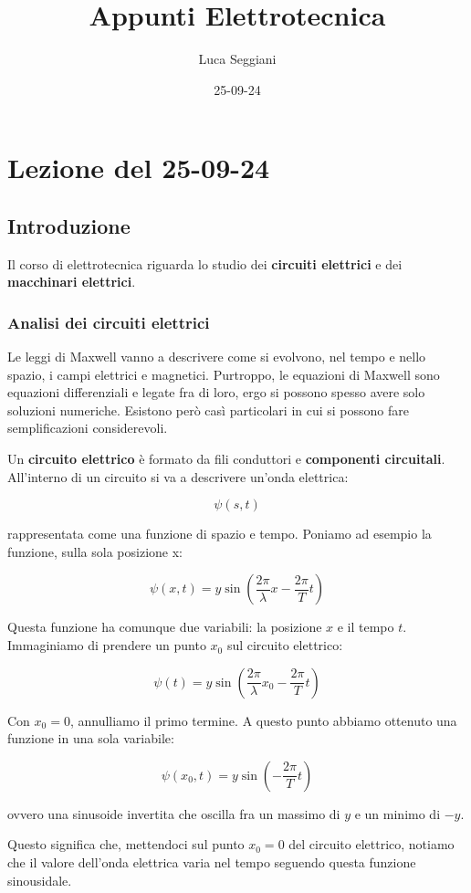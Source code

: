 \documentclass[a4paper,11pt]{article}
\title{Appunti Elettrotecnica}
\author{Luca Seggiani}
\date{25-09-24}
\begin{document}
\section{Lezione del 25-09-24}

\thispagestyle{empty}
\pagestyle{fancy}

\subsection{Introduzione}
Il corso di elettrotecnica riguarda lo studio dei \textbf{circuiti elettrici} e dei \textbf{macchinari elettrici}.

\subsubsection{Analisi dei circuiti elettrici}

Le leggi di Maxwell vanno a descrivere come si evolvono, nel tempo e nello spazio, i campi elettrici e magnetici.
Purtroppo,  le equazioni di Maxwell sono equazioni differenziali e legate fra di loro, ergo si possono spesso avere solo soluzioni numeriche.
Esistono però casì particolari in cui si possono fare semplificazioni considerevoli.

Un \textbf{circuito elettrico} è formato da fili conduttori e \textbf{componenti circuitali}.
All'interno di un circuito si va a descrivere un'onda elettrica:

$$
	\psi(s,t)
$$

rappresentata come una funzione di spazio e tempo.
Poniamo ad esempio la funzione, sulla sola posizione x:

$$
	\psi(x, t) = y \sin{\left( \frac{2\pi}{\lambda}x - \frac{2\pi}{T} t \right)}
$$

Questa funzione ha comunque due variabili: la posizione $x$ e il tempo $t$.
Immaginiamo di prendere un punto $x_0$ sul circuito elettrico:

$$
	\psi(t) = y \sin{\left( \frac{2\pi}{\lambda}x_0 - \frac{2\pi}{T} t \right)}
$$

Con $x_0 = 0$, annulliamo il primo termine.
A questo punto abbiamo ottenuto una funzione in una sola variabile:

$$
\psi(x_0, t) = y \sin{\left( - \frac{2\pi}{T} t \right)}
$$

ovvero una sinusoide invertita che oscilla fra un massimo di $y$ e un minimo di $-y$.

Questo significa che, mettendoci sul punto $x_0 = 0$ del circuito elettrico, notiamo che il valore dell'onda elettrica varia nel tempo seguendo questa funzione sinousidale.
\end{document}
